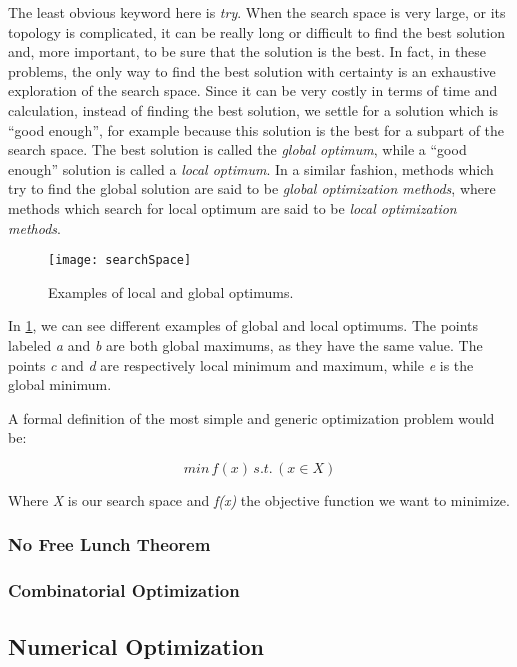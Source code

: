 The least obvious keyword here is \emph{try}. When the search space is very large, or its topology is complicated, it can be really long or difficult to find the best solution and, more important, to be sure that the solution is the best. In fact, in these problems, the only way to find the best solution with certainty is an exhaustive exploration of the search space. Since it can be very costly in terms
of time and calculation, instead of finding the best solution, we settle for a solution which is {}``good enough'', for example because this solution is the best for a subpart of the search space. The best solution is called the \emph{global optimum}, while a {}``good enough'' solution is called a \emph{local optimum}. In a similar fashion, methods which try to find the global solution are said to be \emph{global optimization methods}, where methods which search for local optimum are said to be \emph{local optimization methods}.

\begin{figure}
\centering
\texttt{[image: searchSpace]}
\caption{Examples of local and global optimums.}
\label{Flo:localAndGlobalOptims}
\end{figure}


In \ref{Flo:localAndGlobalOptims}, we can see different examples of global and local optimums. The points labeled \emph{a} and \emph{b} are both global maximums, as they have the same value. The points
\emph{c} and \emph{d} are respectively local minimum and maximum, while \emph{e} is the global minimum.

A formal definition of the most simple and generic optimization problem would be:

\begin{equation}
min\, f(x)\, s.t.\,(x\in X)
\end{equation}

Where \emph{X} is our search space and \emph{f(x)} the objective function we want to minimize. 

\subsubsection{No Free Lunch Theorem}

\subsubsection{Combinatorial Optimization}

\subsection{Numerical Optimization}
